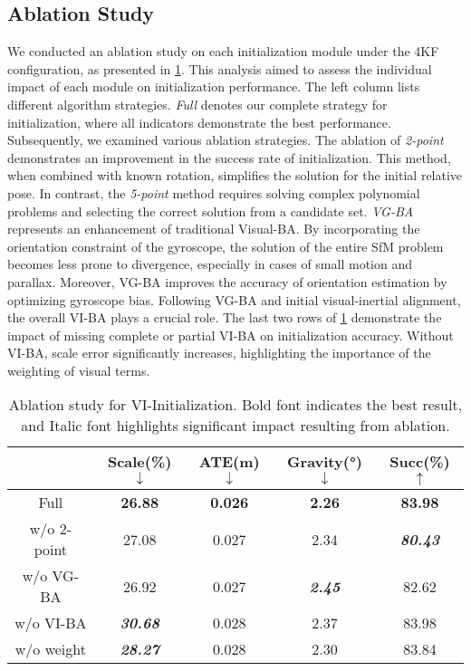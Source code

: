 \subsection{Ablation Study}
We conducted an ablation study on each initialization module under the 4KF configuration, as presented in \cref{tab:Ablation}. This analysis aimed to assess the individual impact of each module on initialization performance. The left column lists different algorithm strategies. \textit{Full} denotes our complete strategy for initialization, where all indicators demonstrate the best performance. Subsequently, we examined various ablation strategies. The ablation of \textit{2-point} demonstrates an improvement in the success rate of initialization. This method, when combined with known rotation, simplifies the solution for the initial relative pose. In contrast, the \textit{5-point} method requires solving complex polynomial problems and selecting the correct solution from a candidate set. \textit{VG-BA} represents an enhancement of traditional Visual-BA. By incorporating the orientation constraint of the gyroscope, the solution of the entire SfM problem becomes less prone to divergence, especially in cases of small motion and parallax. Moreover, VG-BA improves the accuracy of orientation estimation by optimizing gyroscope bias. Following VG-BA and initial visual-inertial alignment, the overall VI-BA plays a crucial role. The last two rows of \cref{tab:Ablation} demonstrate the impact of missing complete or partial VI-BA on initialization accuracy. Without VI-BA, scale error significantly increases, highlighting the importance of the weighting of visual terms.
\begin{table}[h]
    \centering

    \caption{Ablation study for VI-Initialization. Bold font indicates the best result, and Italic font highlights significant impact resulting from ablation.}
    \begin{tabular}{ccccc}
    \toprule
          &  Scale(\%)$\downarrow$&  ATE(m)$\downarrow$&  Gravity(°)$\downarrow$&  Succ(\%)$\uparrow$\\
          \midrule
           Full&  \textbf{26.88}&  \textbf{0.026}&  \textbf{2.26}&  \textbf{83.98}\\
           w/o 2-point&  27.08&  0.027&  2.34&  \textit{\textbf{80.43}}\\
           w/o VG-BA&  26.92&  0.027&  \textit{\textbf{2.45}} &  82.62\\
           w/o VI-BA&  \textit{\textbf{30.68}}&  0.028&  2.37&  83.98\\
          w/o weight&  \textit{\textbf{28.27}}&  0.028&  2.30&  83.84\\
    \bottomrule
    \end{tabular}
    \label{tab:Ablation}
\end{table}

